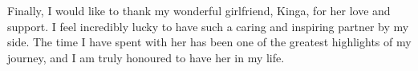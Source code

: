 \begin{acknowledgements}
Finally, I would like to thank my wonderful girlfriend, Kinga, for her love and support. I feel incredibly lucky to have such a caring and inspiring partner by my side. The time I have spent with her has been one of the greatest highlights of my journey, and I am truly honoured to have her in my life.

\end{acknowledgements}

\setcounter{tocdepth}{2} 

\tableofcontents
\listoffigures

